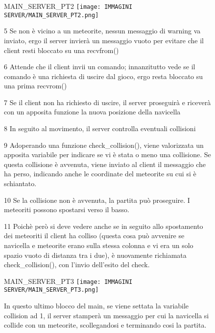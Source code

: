 \documentclass{article}
\begin{document}
\begin{enumerate}
    \begin{figure}[!htb]
    \item MAIN\_SERVER\_PT2
        \centering
        \texttt{[image: IMMAGINI SERVER/MAIN\_SERVER\_PT2.png]}
        \raggedright\par
        \item[5] Se non è vicino a un meteorite, nessun messaggio di warning va inviato, ergo il server invierà un messaggio vuoto per evitare che il client resti bloccato su una recvfrom()
        \item[6] Attende che il client invii un comando; innanzitutto vede se il comando è una richiesta di uscire dal gioco, ergo resta bloccato su una prima recvrom()
        \item[7] Se il client non ha richiesto di uscire, il server proseguirà e riceverà con un apposita funzione la nuova posizione della navicella
        \item[8] In seguito al movimento, il server controlla eventuali collisioni
        \item[9] Adoperando una funzione check\_collision(), viene valorizzata un apposita variabile per indicare se vi è stata o meno una collisione. Se questa collisione è avvenuta, viene inviato al client il messaggio che ha perso, indicando anche le coordinate del meteorite su cui si è schiantato. 
        \item[10] Se la collisione non è avvenuta, la partita può proseguire. I meteoriti possono spostarsi verso il basso.
        \item[11] Poichè però si deve vedere anche se in seguito allo spostamento dei meteoriti il client ha colliso (questa cosa può avvenire se navicella e meteorite erano sulla stessa colonna e vi era un solo spazio vuoto di distanza tra i due), è nuovamente richiamata check\_collision(), con l'invio dell'esito del check.
        
    \end{figure}

    \begin{figure}[!htb]
    \item MAIN\_SERVER\_PT3
        \centering
        \texttt{[image: IMMAGINI SERVER/MAIN\_SERVER\_PT3.png]}
        \raggedright\par
        In questo ultimo blocco del main, se viene settata la variabile collision ad 1, il server stamperà un messaggio per cui la navicella si collide con un meteorite, scollegandosi e terminando cosi la partita.
    \end{figure}
    \end{enumerate}
\end{document}
